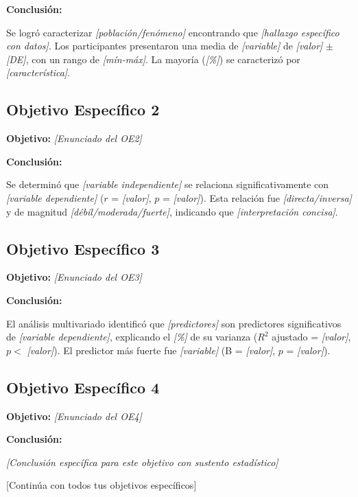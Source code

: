 \textbf{Conclusión:} 

Se logró caracterizar \textit{[población/fenómeno]} encontrando que \textit{[hallazgo específico con datos]}. Los participantes presentaron una media de \textit{[variable]} de \textit{[valor]} $\pm$ \textit{[DE]}, con un rango de \textit{[mín-máx]}. La mayoría (\textit{[\%]}) se caracterizó por \textit{[característica]}.

\subsection{Objetivo Específico 2}
\label{subsec:conclusion_oe2}

\textbf{Objetivo:} \textit{[Enunciado del OE2]}

\textbf{Conclusión:}

Se determinó que \textit{[variable independiente]} se relaciona significativamente con \textit{[variable dependiente]} ($r$ = \textit{[valor]}, $p$ = \textit{[valor]}). Esta relación fue \textit{[directa/inversa]} y de magnitud \textit{[débil/moderada/fuerte]}, indicando que \textit{[interpretación concisa]}.

\subsection{Objetivo Específico 3}
\label{subsec:conclusion_oe3}

\textbf{Objetivo:} \textit{[Enunciado del OE3]}

\textbf{Conclusión:}

El análisis multivariado identificó que \textit{[predictores]} son predictores significativos de \textit{[variable dependiente]}, explicando el \textit{[\%]} de su varianza ($R^2$ ajustado = \textit{[valor]}, $p < $ \textit{[valor]}). El predictor más fuerte fue \textit{[variable]} (B = \textit{[valor]}, $p$ = \textit{[valor]}).

\subsection{Objetivo Específico 4}
\label{subsec:conclusion_oe4}

\textbf{Objetivo:} \textit{[Enunciado del OE4]}

\textbf{Conclusión:}

\textit{[Conclusión específica para este objetivo con sustento estadístico]}

[Continúa con todos tus objetivos específicos]

